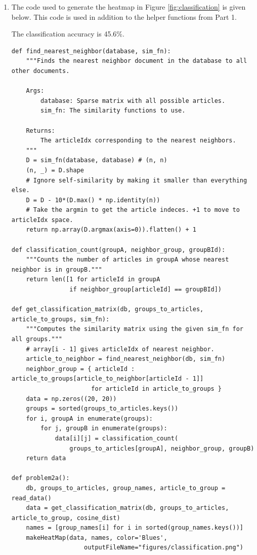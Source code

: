 \documentclass[12pt]{article}
\begin{document}
\begin{enumerate}[label=(\alph*)]
  \item
    The code used to generate the heatmap in Figure \ref{fig:classification} is given below. This code is used in addition to the helper functions from Part 1.

    The classification accuracy is 45.6\%. 
\begin{verbatim}
def find_nearest_neighbor(database, sim_fn):
    """Finds the nearest neighbor document in the database to all other documents.
    
    Args:
        database: Sparse matrix with all possible articles.
        sim_fn: The similarity functions to use.
    
    Returns:
        The articleIdx corresponding to the nearest neighbors.
    """
    D = sim_fn(database, database) # (n, n)
    (n, _) = D.shape
    # Ignore self-similarity by making it smaller than everything else.
    D = D - 10*(D.max() * np.identity(n))
    # Take the argmin to get the article indeces. +1 to move to articleIdx space.
    return np.array(D.argmax(axis=0)).flatten() + 1

def classification_count(groupA, neighbor_group, groupBId):
    """Counts the number of articles in groupA whose nearest neighbor is in groupB."""
    return len([1 for articleId in groupA
                if neighbor_group[articleId] == groupBId])

def get_classification_matrix(db, groups_to_articles, article_to_groups, sim_fn):
    """Computes the similarity matrix using the given sim_fn for all groups."""
    # array[i - 1] gives articleIdx of nearest neighbor.
    article_to_neighbor = find_nearest_neighbor(db, sim_fn)
    neighbor_group = { articleId : article_to_groups[article_to_neighbor[articleId - 1]]
                      for articleId in article_to_groups }
    data = np.zeros((20, 20))
    groups = sorted(groups_to_articles.keys())
    for i, groupA in enumerate(groups):
        for j, groupB in enumerate(groups):
            data[i][j] = classification_count(
                groups_to_articles[groupA], neighbor_group, groupB)
    return data

def problem2a():
    db, groups_to_articles, group_names, article_to_group = read_data()
    data = get_classification_matrix(db, groups_to_articles, article_to_group, cosine_dist)
    names = [group_names[i] for i in sorted(group_names.keys())]
    makeHeatMap(data, names, color='Blues',
                    outputFileName="figures/classification.png")


\end{verbatim}
\end{enumerate}
\end{document}
